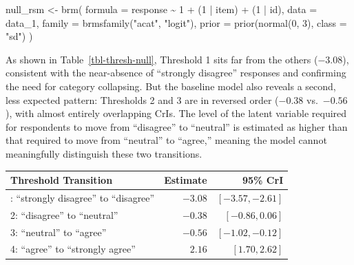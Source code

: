 \documentclass[
  man,
  floatsintext,
  longtable,
  nolmodern,
  notxfonts,
  notimes,
  colorlinks=true,linkcolor=blue,citecolor=blue,urlcolor=blue]{apa7}
\newenvironment{Shaded}{\begin{snugshade}}{\end{snugshade}}
\newcommand{\AttributeTok}[1]{\textcolor[rgb]{0.40,0.45,0.13}{#1}}
\newcommand{\DecValTok}[1]{\textcolor[rgb]{0.68,0.00,0.00}{#1}}
\newcommand{\FunctionTok}[1]{\textcolor[rgb]{0.28,0.35,0.67}{#1}}
\newcommand{\NormalTok}[1]{\textcolor[rgb]{0.00,0.23,0.31}{#1}}
\newcommand{\OtherTok}[1]{\textcolor[rgb]{0.00,0.23,0.31}{#1}}
\newcommand{\SpecialCharTok}[1]{\textcolor[rgb]{0.37,0.37,0.37}{#1}}
\newcommand{\StringTok}[1]{\textcolor[rgb]{0.13,0.47,0.30}{#1}}
\begin{document}
\begin{Shaded}
\begin{Highlighting}[]
\NormalTok{null\_rsm }\OtherTok{\textless{}{-}} \FunctionTok{brm}\NormalTok{(}
  \AttributeTok{formula =}\NormalTok{ response }\SpecialCharTok{\textasciitilde{}} \DecValTok{1} \SpecialCharTok{+}\NormalTok{ (}\DecValTok{1} \SpecialCharTok{|}\NormalTok{ item) }\SpecialCharTok{+}\NormalTok{ (}\DecValTok{1} \SpecialCharTok{|}\NormalTok{ id),}
  \AttributeTok{data =}\NormalTok{ data\_1,}
  \AttributeTok{family =} \FunctionTok{brmsfamily}\NormalTok{(}\StringTok{"acat"}\NormalTok{, }\StringTok{"logit"}\NormalTok{),}
  \AttributeTok{prior =} \FunctionTok{prior}\NormalTok{(}\FunctionTok{normal}\NormalTok{(}\DecValTok{0}\NormalTok{, }\DecValTok{3}\NormalTok{), }\AttributeTok{class =} \StringTok{"sd"}\NormalTok{)}
\NormalTok{)}
\end{Highlighting}
\end{Shaded}

As shown in Table~\ref{tbl-thresh-null}, Threshold 1 sits far from the
others (\(-3.08\)), consistent with the near-absence of ``strongly
disagree'' responses and confirming the need for category collapsing.
But the baseline model also reveals a second, less expected pattern:
Thresholds 2 and 3 are in reversed order (\(-0.38\) vs.~\(-0.56\)), with
almost entirely overlapping CrIs. The level of the latent variable
required for respondents to move from ``disagree'' to ``neutral'' is
estimated as higher than that required to move from ``neutral'' to
``agree,'' meaning the model cannot meaningfully distinguish these two
transitions.

\begin{table}

{\caption{{Threshold estimates from
\texttt{null\_rsm}.}{\label{tbl-thresh-null}}}
\vspace{-20pt}}

\begin{longtable}[]{@{}lrr@{}}
\toprule\noalign{}
Threshold Transition & Estimate & 95\% CrI \\
\midrule\noalign{}
\endhead
\bottomrule\noalign{}
\endlastfoot
1: ``strongly disagree'' to ``disagree'' & \(-3.08\) &
\([-3.57, -2.61]\) \\
2: ``disagree'' to ``neutral'' & \(-0.38\) & \([-0.86, 0.06]\) \\
3: ``neutral'' to ``agree'' & \(-0.56\) & \([-1.02, -0.12]\) \\
4: ``agree'' to ``strongly agree'' & \(2.16\) & \([1.70, 2.62]\) \\
\end{longtable}

\end{table}
\end{document}
